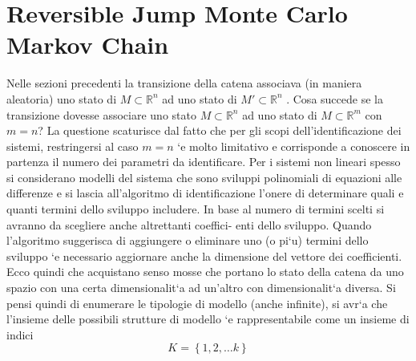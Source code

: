 \chapter{Reversible Jump Monte Carlo Markov Chain}
Nelle sezioni precedenti la transizione della catena associava (in maniera aleatoria)
uno stato di $M\subset \mathbb{R}^n$ ad uno stato di  $M'\subset \mathbb{R}^n$ .
Cosa succede se la transizione dovesse associare uno stato $M\subset \mathbb{R}^n$ ad uno stato
di $M\subset \mathbb{R}^m$ con $ m = n$?
La questione scaturisce dal fatto che per gli scopi dell’identificazione dei sistemi,
restringersi al caso $m = n$ `e molto limitativo e corrisponde a conoscere in partenza
il numero dei parametri da identificare.
Per i sistemi non lineari spesso si considerano modelli del sistema che sono sviluppi
polinomiali di equazioni alle differenze e si lascia all’algoritmo di identificazione
l’onere di determinare quali e quanti termini dello sviluppo includere.
In base al numero di termini scelti si avranno da scegliere anche altrettanti coeffici-
enti dello sviluppo.
Quando l’algoritmo suggerisca di aggiungere o eliminare uno (o pi`u) termini dello
sviluppo `e necessario aggiornare anche la dimensione del vettore dei coefficienti.
Ecco quindi che acquistano senso mosse che portano lo stato della catena da uno
spazio con una certa dimensionalit`a ad un’altro con dimensionalit`a diversa.
Si pensi quindi di enumerare le tipologie di modello (anche infinite), si avr`a che
l’insieme delle possibili strutture di modello `e rappresentabile come un insieme di
indici
\begin{equation*}
K=\left\lbrace 1,2,\dots k \right\rbrace
\end{equation*}